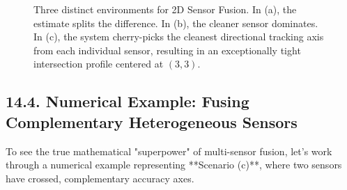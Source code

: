 \documentclass{article}
\begin{document}
\begin{figure}[H]
\begin{minipage}{0.32\textwidth}
\end{minipage}
\caption{Three distinct environments for 2D Sensor Fusion. In (a), the estimate splits the difference. In (b), the cleaner sensor dominates. In (c), the system cherry-picks the cleanest directional tracking axis from each individual sensor, resulting in an exceptionally tight intersection profile centered at $(3,3)$.}
\label{fig:sensor_fusion_cases}
\end{figure}

\subsection*{14.4. Numerical Example: Fusing Complementary Heterogeneous Sensors}

To see the true mathematical "superpower" of multi-sensor fusion, let's work through a numerical example representing **Scenario (c)**, where two sensors have crossed, complementary accuracy axes.
\end{document}
